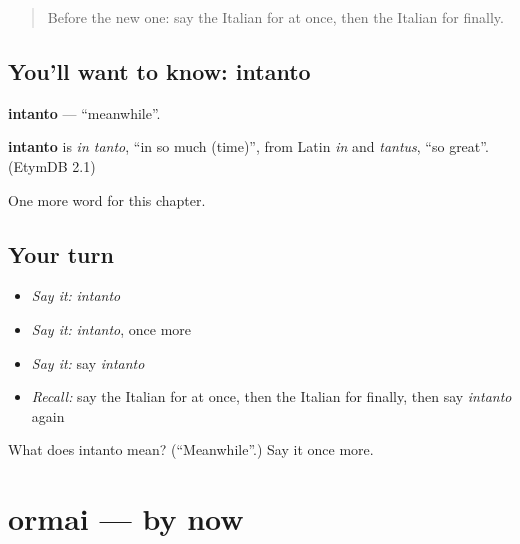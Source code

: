 \label{lesson:IT-C153-intanto}



\begin{quote}
Before the new one: say the Italian for at once, then the Italian for finally.
\end{quote}

\subsection*{You'll want to know: intanto}
\textbf{intanto} — \textquotedblleft{}meanwhile\textquotedblright{}.

\begin{cousinweb}
\textbf{intanto} is \emph{in tanto}, \textquotedblleft{}in so much (time)\textquotedblright{}, from Latin \emph{in} and \emph{tantus}, \textquotedblleft{}so great\textquotedblright{}. (EtymDB 2.1)
\end{cousinweb}

\begin{grammarlens}[title={What you've built}]
One more word for this chapter.
\end{grammarlens}

\subsection*{Your turn}
\begin{itemize}
\raggedright
  \item \emph{Say it:} \emph{intanto}
  \item \emph{Say it:} \emph{intanto}, once more
  \item \emph{Say it:} say \emph{intanto}
  \item \emph{Recall:} say the Italian for at once, then the Italian for finally, then say \emph{intanto} again
\end{itemize}

\begin{tcolorbox}[breakable,colback=teal!4,colframe=teal!35!black,title={Before you move on}]
What does intanto mean? (\textquotedblleft{}Meanwhile\textquotedblright{}.) Say it once more.
\end{tcolorbox}
\section[ormai]{ormai — by now}

\label{lesson:IT-C153-ormai}



